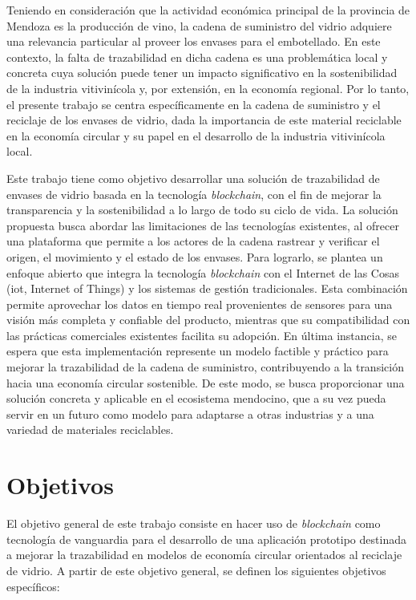 Teniendo en consideración que la actividad económica principal de la provincia de Mendoza es la producción de vino, la cadena de suministro del vidrio adquiere una relevancia particular al proveer los envases para el embotellado. En este contexto, la falta de trazabilidad en dicha cadena es una problemática local y concreta cuya solución puede tener un impacto significativo en la sostenibilidad de la industria vitivinícola y, por extensión, en la economía regional. Por lo tanto, el presente trabajo se centra específicamente en la cadena de suministro y el reciclaje de los envases de vidrio, dada la importancia de este material reciclable en la economía circular y su papel en el desarrollo de la industria vitivinícola local.

Este trabajo tiene como objetivo desarrollar una solución de trazabilidad de envases de vidrio basada en la tecnología \textit{blockchain}, con el fin de mejorar la transparencia y la sostenibilidad a lo largo de todo su ciclo de vida. La solución propuesta busca abordar las limitaciones de las tecnologías existentes, al ofrecer una plataforma que permite a los actores de la cadena rastrear y verificar el origen, el movimiento y el estado de los envases. Para lograrlo, se plantea un enfoque abierto que integra la tecnología \textit{blockchain} con el Internet de las Cosas (\gls{iot}, Internet of Things) y los sistemas de gestión tradicionales. Esta combinación permite aprovechar los datos en tiempo real provenientes de sensores para una visión más completa y confiable del producto, mientras que su compatibilidad con las prácticas comerciales existentes facilita su adopción. En última instancia, se espera que esta implementación represente un modelo factible y práctico para mejorar la trazabilidad de la cadena de suministro, contribuyendo a la transición hacia una economía circular sostenible. De este modo, se busca proporcionar una solución concreta y aplicable en el ecosistema mendocino, que a su vez pueda servir en un futuro como modelo para adaptarse a otras industrias y a una variedad de materiales reciclables.

\section{Objetivos}
\label{sec:goals}

El objetivo general de este trabajo consiste en hacer uso de \textit{blockchain} como tecnología de vanguardia para el desarrollo de una aplicación prototipo destinada a mejorar la trazabilidad en modelos de economía circular orientados al reciclaje de vidrio. A partir de este objetivo general, se definen los siguientes objetivos específicos:


